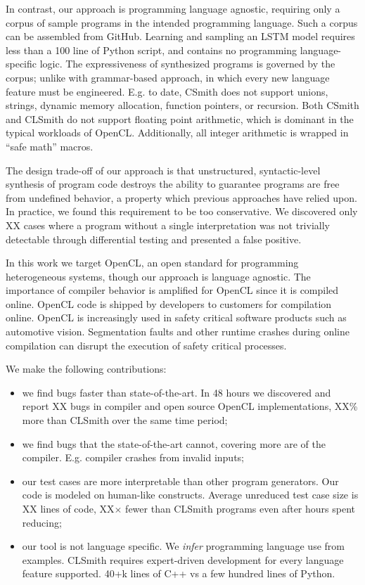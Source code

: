 In contrast, our approach is programming language agnostic, requiring only a corpus of sample programs in the intended programming language. Such a corpus can be assembled from GitHub. Learning and sampling an LSTM model requires less than a 100 line of Python script, and contains no programming language-specific logic. The expressiveness of synthesized programs is governed by the corpus; unlike with grammar-based approach, in which every new language feature must be engineered. E.g. to date, CSmith does not support unions, strings, dynamic memory allocation, function pointers, or recursion. Both CSmith and CLSmith do not support floating point arithmetic, which is dominant in the typical workloads of OpenCL. Additionally, all integer arithmetic is wrapped in ``safe math'' macros.

The design trade-off of our approach is that unstructured, syntactic-level synthesis of program code destroys the ability to guarantee programs are free from undefined behavior, a property which previous approaches have relied upon. In practice, we found this requirement to be too conservative. We discovered only XX cases where a program without a single interpretation was not trivially detectable through differential testing and presented a false positive.

In this work we target OpenCL, an open standard for programming heterogeneous systems, though our approach is language agnostic. The importance of compiler behavior is amplified for OpenCL since it is compiled online. OpenCL code is shipped by developers to customers for compilation online. OpenCL is increasingly used in safety critical software products such as automotive vision. Segmentation faults and other runtime crashes during online compilation can disrupt the execution of safety critical processes.

\noindent We make the following contributions:
%
\begin{itemize}
\item we find bugs faster than state-of-the-art. In 48 hours we discovered and report XX bugs in compiler and open source OpenCL implementations, XX\% more than CLSmith over the same time period;
\item we find bugs that the state-of-the-art cannot, covering more are of the compiler. E.g. compiler crashes from invalid inputs;
\item our test cases are more interpretable than other program generators. Our code is modeled on human-like constructs. Average unreduced test case size is XX lines of code, XX$\times$ fewer than CLSmith programs even after hours spent reducing;
\item our tool is not language specific. We \emph{infer} programming language use from examples. CLSmith requires expert-driven development for every language feature supported. 40+k lines of C++ vs a few hundred lines of Python.
\end{itemize}
